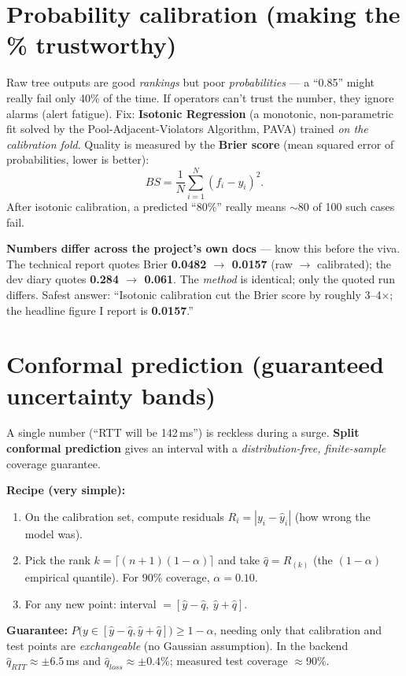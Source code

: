 \documentclass[11pt,a4paper]{article}
\newcommand{\warn}[1]{%
  \par\vspace{3pt}\noindent
  \colorbox{warnbg}{\parbox{\dimexpr\linewidth-2\fboxsep}{\small #1}}%
  \par\vspace{3pt}}
\begin{document}
\section{Probability calibration (making the \% trustworthy)}
Raw tree outputs are good \emph{rankings} but poor \emph{probabilities} --- a ``0.85'' might really fail only
40\% of the time. If operators can't trust the number, they ignore alarms (alert fatigue). Fix:
\textbf{Isotonic Regression} (a monotonic, non-parametric fit solved by the Pool-Adjacent-Violators
Algorithm, PAVA) trained \emph{on the calibration fold}. Quality is measured by the \textbf{Brier score}
(mean squared error of probabilities, lower is better):
\[ BS=\frac{1}{N}\sum_{i=1}^{N}(f_i-y_i)^2. \]
After isotonic calibration, a predicted ``80\%'' really means $\sim$80 of 100 such cases fail.

\warn{\textbf{Numbers differ across the project's own docs} --- know this before the viva. The technical report
quotes Brier \textbf{0.0482 $\rightarrow$ 0.0157} (raw $\rightarrow$ calibrated); the dev diary quotes
\textbf{0.284 $\rightarrow$ 0.061}. The \emph{method} is identical; only the quoted run differs. Safest answer:
``Isotonic calibration cut the Brier score by roughly 3--4$\times$; the headline figure I report is
\textbf{0.0157}.''}

\section{Conformal prediction (guaranteed uncertainty bands)}
A single number (``RTT will be 142\,ms'') is reckless during a surge. \textbf{Split conformal prediction}
gives an interval with a \emph{distribution-free, finite-sample} coverage guarantee.

\textbf{Recipe (very simple):}
\begin{enumerate}
  \item On the calibration set, compute residuals $R_i=|y_i-\hat{y}_i|$ (how wrong the model was).
  \item Pick the rank $k=\lceil (n+1)(1-\alpha)\rceil$ and take $\hat q = R_{(k)}$ (the $(1-\alpha)$ empirical
  quantile). For 90\% coverage, $\alpha=0.10$.
  \item For any new point: interval $=[\hat y-\hat q,\ \hat y+\hat q]$.
\end{enumerate}
\textbf{Guarantee:} $P\big(y\in[\hat y-\hat q,\hat y+\hat q]\big)\geq 1-\alpha$, needing only that
calibration and test points are \emph{exchangeable} (no Gaussian assumption). In the backend
$\hat q_{RTT}\approx\pm6.5$\,ms and $\hat q_{loss}\approx\pm0.4\%$; measured test coverage $\approx$90\%.
\end{document}
